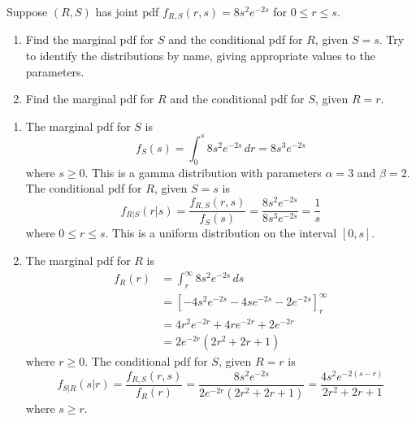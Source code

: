 \documentclass[12pt]{article}
\newenvironment{problem}[2][Problem]{\begin{trivlist}
\item[\hskip \labelsep {\bfseries #1}\hskip \labelsep {\bfseries #2.}]}
{\end{trivlist}}
\begin{document}
\begin{problem}{6}
  Suppose $(R, S)$ has joint pdf 
  $f_{R,S}(r, s) = 8s^2 e^{-2s}$ for $0 \le r \le s$.
  \begin{enumerate}
    \item Find the marginal pdf for $S$ and the conditional pdf 
    for $R$, given $S = s$. Try to identify the distributions by name, 
    giving appropriate values to the parameters.
    \item Find the marginal pdf for $R$ and the conditional pdf 
    for $S$, given $R = r$.
  \end{enumerate}
  \begin{enumerate}
    \item The marginal pdf for $S$ is
    \[
      f_S (s) = \int_0^s 8s^2 e^{-2s} \, dr = 8s^3 e^{-2s}
    \]
    where $s \geq 0$. This is a gamma distribution with parameters
    $\alpha = 3$ and $\beta = 2$. The conditional pdf for $R$, given $S = s$ is
    \[
      f_{R|S} (r|s) = \frac{f_{R,S}(r,s)}{f_S (s)} 
      = \frac{8s^2 e^{-2s}}{8s^3 e^{-2s}} = \frac{1}{s}
    \]
    where $0 \le r \le s$. This is a uniform distribution on the interval $[0, s]$.
    \item The marginal pdf for $R$ is
    \[
      \begin{aligned}
        f_R (r) &= \int_r^{\infty} 8s^2 e^{-2s} \, ds \\
        &= \left[ -4s^2 e^{-2s} - 4s e^{-2s} - 2 e^{-2s} \right]_{r}^{\infty} \\
        &= 4r^2 e^{-2r} + 4r e^{-2r} + 2 e^{-2r} \\
        &= 2e^{-2r} (2r^2 + 2r + 1)
      \end{aligned}
    \]
    where $r \geq 0$. The conditional pdf for $S$, given $R = r$ is
    \[
      f_{S|R} (s|r) = \frac{f_{R,S}(r,s)}{f_R (r)} 
      = \frac{8s^2 e^{-2s}}{2e^{-2r} (2r^2 + 2r + 1)} 
      = \frac{4s^2 e^{-2(s-r)}}{2r^2 + 2r + 1}
    \]
    where $s \geq r$.
  \end{enumerate}
\end{problem}
\end{document}
